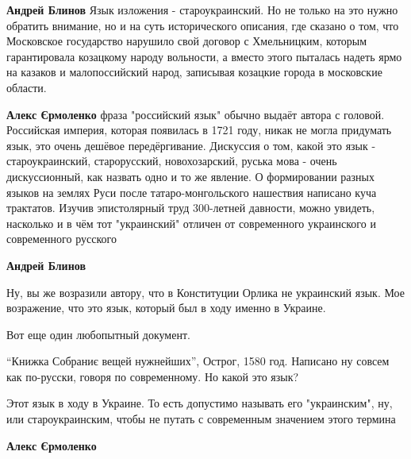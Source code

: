\begin{itemize}
\begin{itemize}
\textbf{Андрей Блинов} Язык изложения - староукраинский. Но не только на это нужно обратить внимание, но и на суть исторического описания, где сказано о том, что Московское государство нарушило свой договор с Хмельницким, которым гарантировала козацкому народу вольности, а вместо этого пыталась надеть ярмо на казаков и малопоссийский народ, записывая козацкие города в московские области.

 

\textbf{Алекс Єрмоленко} фраза "российский язык" обычно выдаёт автора с головой. Российская империя, которая появилась в 1721 году, никак не могла придумать язык, это очень дешёвое передёргивание. Дискуссия о том, какой это язык - староукраинский, старорусский, новохозарский, руська мова - очень дискуссионный, как назвать одно и то же явление. О формировании разных языков на землях Руси после татаро-монгольского нашествия написано куча трактатов. Изучив эпистолярный труд 300-летней давности, можно увидеть, насколько и в чём тот "украинский" отличен от современного украинского и современного русского

 
\textbf{Андрей Блинов} 

Ну, вы же возразили автору, что в Конституции Орлика не украинский язык. Мое
возражение, что это язык, который был в ходу именно в Украине.

Вот еще один любопытный документ.

\enquote{Книжка Собраниє вещей нужнейших}, Острог, 1580 год. Написано ну совсем как
по-русски, говоря по современному. Но какой это язык?

Этот язык в ходу в Украине. То есть допустимо называть его "украинским", ну,
или староукраинским, чтобы не путать с современным значением этого термина

 
\textbf{Алекс Єрмоленко}


\end{itemize}
\end{itemize}
